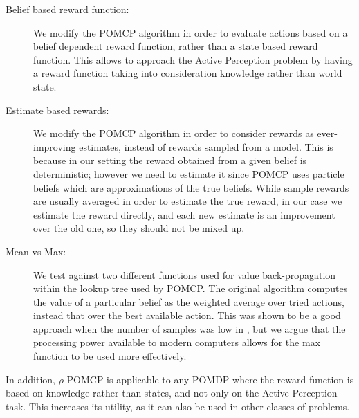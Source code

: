\begin{description}
    \item[Belief based reward function:] We modify the POMCP algorithm in order to evaluate actions
        based on a belief dependent reward function, rather than a state based reward function. This
        allows to approach the Active Perception problem by having a reward function taking into
        consideration knowledge rather than world state.
    \item[Estimate based rewards:] We modify the POMCP algorithm in order to consider rewards as
        ever-improving estimates, instead of rewards sampled from a model. This is because in our
        setting the reward obtained from a given belief is deterministic; however we need to estimate
        it since POMCP uses particle beliefs which are approximations of the true beliefs. While
        sample rewards are usually averaged in order to estimate the true reward, in our case we
        estimate the reward directly, and each new estimate is an improvement over the old one, so they
        should not be mixed up. 
    \item[Mean vs Max:] We test against two different functions used for value back-propagation within
        the lookup tree used by POMCP. The original algorithm computes the value of a particular
        belief as the weighted average over tried actions, instead that over the best available
        action. This was shown to be a good approach when the number of samples was low in
        \cite{cit:mcts}, but we argue that the processing power available to modern computers allows
        for the max function to be used more effectively.
\end{description}

In addition, $\rho$-POMCP is applicable to any POMDP where the reward function is based on knowledge
rather than states, and not only on the Active Perception task. This increases its utility, as it
can also be used in other classes of problems.

